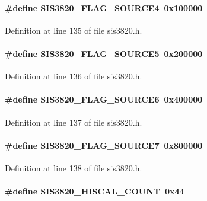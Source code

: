 \paragraph[{SIS3820\_\-FLAG\_\-SOURCE4}]{\setlength{\rightskip}{0pt plus 5cm}\#define SIS3820\_\-FLAG\_\-SOURCE4~0x100000}\hfill\label{sis3820_8h_a4b3e31b4c5c78850a8f9e80a72ac67ad}


Definition at line 135 of file sis3820.h.
\paragraph[{SIS3820\_\-FLAG\_\-SOURCE5}]{\setlength{\rightskip}{0pt plus 5cm}\#define SIS3820\_\-FLAG\_\-SOURCE5~0x200000}\hfill\label{sis3820_8h_a8c43aa24091277f0133803631dc02c30}


Definition at line 136 of file sis3820.h.
\paragraph[{SIS3820\_\-FLAG\_\-SOURCE6}]{\setlength{\rightskip}{0pt plus 5cm}\#define SIS3820\_\-FLAG\_\-SOURCE6~0x400000}\hfill\label{sis3820_8h_a5406639aaa4aeef33466270a1ea4fe5c}


Definition at line 137 of file sis3820.h.
\paragraph[{SIS3820\_\-FLAG\_\-SOURCE7}]{\setlength{\rightskip}{0pt plus 5cm}\#define SIS3820\_\-FLAG\_\-SOURCE7~0x800000}\hfill\label{sis3820_8h_ac786b34e0ca0c7c1b845d6c539400ece}


Definition at line 138 of file sis3820.h.
\paragraph[{SIS3820\_\-HISCAL\_\-COUNT}]{\setlength{\rightskip}{0pt plus 5cm}\#define SIS3820\_\-HISCAL\_\-COUNT~0x44}\hfill\label{sis3820_8h_a9abb0a83f51fdcbe43283b00e1fd13b3}



